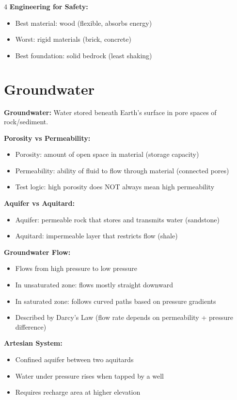 \documentclass[10pt]{article}
\begin{document}
\begin{multicols}{4}
\textbf{Engineering for Safety:}
\begin{itemize}
\item Best material: wood (flexible, absorbs energy)
\item Worst: rigid materials (brick, concrete)
\item Best foundation: solid bedrock (least shaking)
\end{itemize}

\section*{Groundwater}

\textbf{Groundwater:}
Water stored beneath Earth's surface in pore spaces of rock/sediment.

\textbf{Porosity vs Permeability:}
\begin{itemize}
\item Porosity: amount of open space in material (storage capacity)
\item Permeability: ability of fluid to flow through material (connected pores)
\item Test logic: high porosity does NOT always mean high permeability
\end{itemize}

\textbf{Aquifer vs Aquitard:}
\begin{itemize}
\item Aquifer: permeable rock that stores and transmits water (sandstone)
\item Aquitard: impermeable layer that restricts flow (shale)
\end{itemize}

\textbf{Groundwater Flow:}
\begin{itemize}
\item Flows from high pressure to low pressure
\item In unsaturated zone: flows mostly straight downward
\item In saturated zone: follows curved paths based on pressure gradients
\item Described by Darcy’s Law (flow rate depends on permeability + pressure difference)
\end{itemize}

\textbf{Artesian System:}
\begin{itemize}
\item Confined aquifer between two aquitards
\item Water under pressure rises when tapped by a well
\item Requires recharge area at higher elevation
\end{itemize}


\end{multicols}
\end{document}
